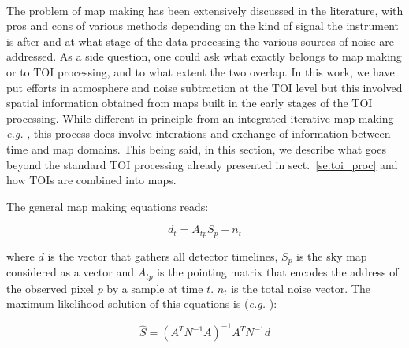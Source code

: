 
~\\

The problem of map making has been extensively discussed in the literature, with
pros and cons of various methods depending on the kind of signal the instrument
is after and at what stage of the data processing the various sources of noise
are addressed. As a side question, one could ask what exactly belongs to map
making or to TOI processing, and to what extent the two overlap. In this work,
we have put efforts in atmosphere and noise subtraction at the TOI level but
this involved spatial information obtained from maps built in the early stages
of the TOI processing. While different in principle from an integrated
iterative map making {\it e.g.} \cite{sanepic}, this process does involve interations and
exchange of information between time and map domains. This being said, in this
section, we describe what goes beyond the standard TOI processing already
presented in sect.~\ref{se:toi_proc} and how TOIs are combined into maps.

The general map making equations reads:

\begin{equation}
d_t = A_{tp}S_p + n_t
\end{equation}

where $d$ is the vector that gathers all detector timelines, $S_p$ is the sky
map considered as a vector and $A_{tp}$ is the pointing matrix that encodes the
address of the observed pixel $p$ by a sample at time $t$. $n_t$ is the total
noise vector. The maximum likelihood solution of this equations is ({\it e.g. }
\cite{madmap}):

\begin{equation}
\hat{S} = \left(A^TN^{-1}A\right)^{-1}A^TN^{-1}d
\label{eq:map_making}
\end{equation}

